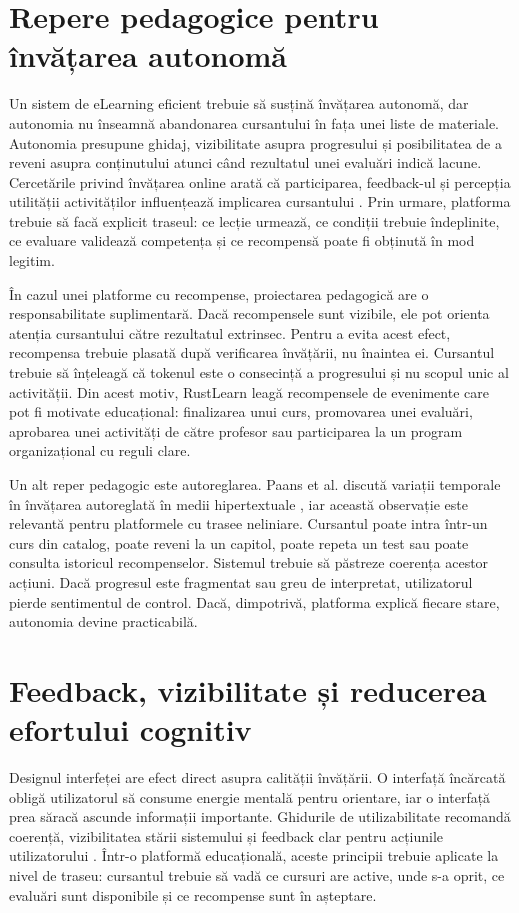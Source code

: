 \section{Repere pedagogice pentru învățarea autonomă}
Un sistem de eLearning eficient trebuie să susțină învățarea autonomă, dar autonomia nu înseamnă abandonarea cursantului în fața unei liste de materiale. Autonomia presupune ghidaj, vizibilitate asupra progresului și posibilitatea de a reveni asupra conținutului atunci când rezultatul unei evaluări indică lacune. Cercetările privind învățarea online arată că participarea, feedback-ul și percepția utilității activităților influențează implicarea cursantului \cite{hrastinski2009diversity,martin2018engagement}. Prin urmare, platforma trebuie să facă explicit traseul: ce lecție urmează, ce condiții trebuie îndeplinite, ce evaluare validează competența și ce recompensă poate fi obținută în mod legitim.

În cazul unei platforme cu recompense, proiectarea pedagogică are o responsabilitate suplimentară. Dacă recompensele sunt vizibile, ele pot orienta atenția cursantului către rezultatul extrinsec. Pentru a evita acest efect, recompensa trebuie plasată după verificarea învățării, nu înaintea ei. Cursantul trebuie să înțeleagă că tokenul este o consecință a progresului și nu scopul unic al activității. Din acest motiv, RustLearn leagă recompensele de evenimente care pot fi motivate educațional: finalizarea unui curs, promovarea unei evaluări, aprobarea unei activități de către profesor sau participarea la un program organizațional cu reguli clare.

Un alt reper pedagogic este autoreglarea. Paans et al. discută variații temporale în învățarea autoreglată în medii hipertextuale \cite{paans2018}, iar această observație este relevantă pentru platformele cu trasee neliniare. Cursantul poate intra într-un curs din catalog, poate reveni la un capitol, poate repeta un test sau poate consulta istoricul recompenselor. Sistemul trebuie să păstreze coerența acestor acțiuni. Dacă progresul este fragmentat sau greu de interpretat, utilizatorul pierde sentimentul de control. Dacă, dimpotrivă, platforma explică fiecare stare, autonomia devine practicabilă.

\section{Feedback, vizibilitate și reducerea efortului cognitiv}
Designul interfeței are efect direct asupra calității învățării. O interfață încărcată obligă utilizatorul să consume energie mentală pentru orientare, iar o interfață prea săracă ascunde informații importante. Ghidurile de utilizabilitate recomandă coerență, vizibilitatea stării sistemului și feedback clar pentru acțiunile utilizatorului \cite{badashian2008,uiux_basics}. Într-o platformă educațională, aceste principii trebuie aplicate la nivel de traseu: cursantul trebuie să vadă ce cursuri are active, unde s-a oprit, ce evaluări sunt disponibile și ce recompense sunt în așteptare.

